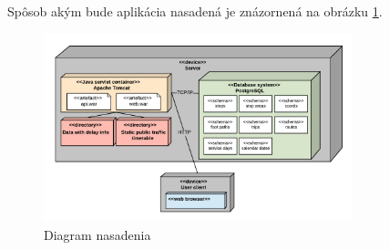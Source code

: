 Spôsob akým bude aplikácia nasadená je znázornená na obrázku \ref{fig:deploymentDiagram}.

\begin{figure}[H]
\centerline{\includegraphics[width=0.8\textwidth]{images/deployment-diagram}}
\caption[Diagram nasadenia]{Diagram nasadenia}
\label{fig:deploymentDiagram}
\end{figure}




